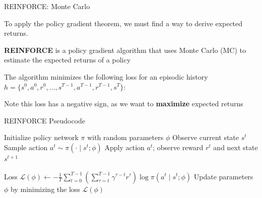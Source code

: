 \begin{frame}[t]{REINFORCE: Monte Carlo}

To apply the policy gradient theorem, we must find a way to derive expected returns.

\blist
    \item \textbf{REINFORCE} is a policy gradient algorithm that uses Monte Carlo (MC) to estimate the expected returns of a policy
    \item<2-> The algorithm minimizes the following loss for an episodic history $h = \{s^0, a^0, r^0, ... ,s^{T-1}, a^{T-1}, r^{T-1}, s^T\}$:
\elist
\vspace{0pt}

\blist
    \item<3-> Note this loss has a negative sign, as we want to \textbf{maximize} expected returns
\elist    
\end{frame}

\begin{frame}[t]{REINFORCE Pseudocode}

    \State Initialize policy network $\pi$ with random parameters $\phi$
            \State Observe current state $s^t$
            \State Sample action $a^t \sim \pi(\cdot \mid s^t; \phi)$
            \State Apply action $a^t$; observe reward $r^t$ and next state $s^{t+1}$
        \EndFor

        \State Loss $\mathcal{L}(\phi) \gets - \frac{1}{T} \sum_{t=0}^{T-1} \left(\sum_{\tau=t}^{T-1} \gamma^{\tau-t} r^\tau\right) \log \pi(a^t \mid s^t; \phi)$
        \State Update parameters $\phi$ by minimizing the loss $\mathcal{L}(\phi)$
    \EndFor
\ealg

\end{frame}

